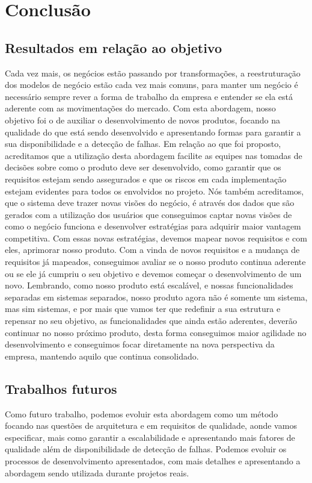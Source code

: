 \part{Conclusão}
  \chapter{Resultados em relação ao objetivo}
    Cada vez mais, os negócios estão passando por transformações, a reestruturação
    dos modelos de negócio estão cada vez mais comuns, para manter um negócio é
    necessário sempre rever a forma de trabalho da empresa e entender se ela está
    aderente com as movimentações do mercado. \newline
    Com esta abordagem, nosso objetivo foi o de auxiliar o desenvolvimento de novos
    produtos, focando na qualidade do que está sendo desenvolvido e apresentando
    formas para garantir a sua disponibilidade e a detecção de falhas. Em relação
    ao que foi proposto, acreditamos que a utilização desta abordagem facilite as
    equipes nas tomadas de decisões sobre como o produto deve ser desenvolvido,
    como garantir que os requisitos estejam sendo assegurados e que os riscos em
    cada implementação estejam evidentes para todos os envolvidos no projeto.\newline
    Nós também acreditamos, que o sistema deve trazer novas visões do negócio, é
    através dos dados que são gerados com a utilização dos usuários que conseguimos
    captar novas visões de como o negócio funciona e desenvolver estratégias
    para adquirir maior vantagem competitiva. Com essas novas estratégias, devemos
    mapear novos requisitos e com eles, aprimorar nosso produto. \newline
    Com a vinda de novos requisitos e a mudança de requisitos já mapeados, conseguimos
    avaliar se o nosso produto continua aderente ou se ele já cumpriu o seu objetivo
    e devemos começar o desenvolvimento de um novo. Lembrando, como nosso produto
    está escalável, e nossas funcionalidades separadas em sistemas separados, nosso
    produto agora não é somente um sistema, mas sim sistemas, e por mais que vamos
    ter que redefinir a sua estrutura e repensar no seu objetivo, as funcionalidades
    que ainda estão aderentes, deverão continuar no nosso próximo produto, desta
    forma conseguimos maior agilidade no desenvolvimento e conseguimos focar
    diretamente na nova perspectiva da empresa, mantendo aquilo que continua
    consolidado.

  \chapter{Trabalhos futuros}
    Como futuro trabalho, podemos evoluir esta abordagem como um método focando
    nas questões de arquitetura e em requisitos de qualidade, aonde vamos especificar,
    mais como garantir a escalabilidade e apresentando mais fatores de qualidade
    além de disponibilidade de detecção de falhas. Podemos evoluir os processos de
    desenvolvimento apresentados, com mais detalhes e apresentando a abordagem sendo
    utilizada durante projetos reais.
